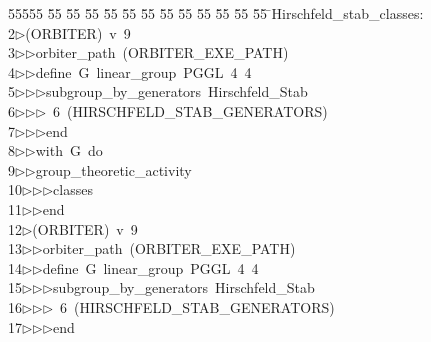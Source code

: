 %
%
\begin{tabbing}
55555 \= 55 \= 55 \= 55 \= 55 \= 55 \= 55 \= 55 \= 55 \= 55 \= 55 \= 55 \= 55 \= \>Hirschfeld\_stab\_classes:\\[0pt]
2\>$\triangleright$\>(ORBITER)\ v\ 9\ \\[0pt]
3\>$\triangleright$\>$\triangleright$\>orbiter\_path\ (ORBITER\_EXE\_PATH)\ \\[0pt]
4\>$\triangleright$\>$\triangleright$\>define\ G\ linear\_group\ PGGL\ 4\ 4\ \\[0pt]
5\>$\triangleright$\>$\triangleright$\>$\triangleright$\>subgroup\_by\_generators\ Hirschfeld\_Stab\ \\[0pt]
6\>$\triangleright$\>$\triangleright$\>$\triangleright$\ 6\ (HIRSCHFELD\_STAB\_GENERATORS)\ \\[0pt]
7\>$\triangleright$\>$\triangleright$\>$\triangleright$\>end\ \\[0pt]
8\>$\triangleright$\>$\triangleright$\>with\ G\ do\ \\[0pt]
9\>$\triangleright$\>$\triangleright$\>group\_theoretic\_activity\ \\[0pt]
10\>$\triangleright$\>$\triangleright$\>$\triangleright$\>classes\ \\[0pt]
11\>$\triangleright$\>$\triangleright$\>end\\[0pt]
12\>$\triangleright$\>(ORBITER)\ v\ 9\ \\[0pt]
13\>$\triangleright$\>$\triangleright$\>orbiter\_path\ (ORBITER\_EXE\_PATH)\ \\[0pt]
14\>$\triangleright$\>$\triangleright$\>define\ G\ linear\_group\ PGGL\ 4\ 4\ \\[0pt]
15\>$\triangleright$\>$\triangleright$\>$\triangleright$\>subgroup\_by\_generators\ Hirschfeld\_Stab\ \\[0pt]
16\>$\triangleright$\>$\triangleright$\>$\triangleright$\ 6\ (HIRSCHFELD\_STAB\_GENERATORS)\ \\[0pt]
17\>$\triangleright$\>$\triangleright$\>$\triangleright$\>end\ \\[0pt]

\end{tabbing}
